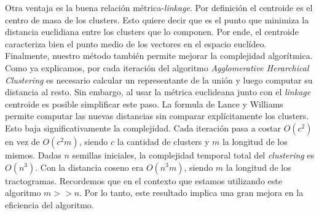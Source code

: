 Otra ventaja es la buena relaci\'on m\'etrica-\textit{linkage}. Por definici\'on
el centroide es el centro de masa de los clusters. Esto quiere decir que es el 
punto que minimiza la distancia euclidiana entre los clusters que lo componen. 
Por ende, el centroide caracteriza bien el punto medio de los vectores en el
espacio eucl\'ideo. \\

Finalmente, nuestro m\'etodo tambi\'en permite mejorar la complejidad algor\'itmica.
Como ya explicamos, por cada iteraci\'on del algoritmo 
\textit{Agglomerative Herarchical Clustering} es necesario calcular un representante
de la uni\'on y luego computar su distancia al resto. Sin embargo, al usar la
m\'etrica euclideana junto con el \textit{linkage} centroide es posible simplificar
este paso. La formula de Lance y Williams permite computar las nuevas distancias
sin comparar expl\'icitamente los clusters. Esto baja significativamente la
complejidad. Cada iteraci\'on pasa a costar $O(c^2)$ en vez de $O(c^2 m)$, siendo
$c$ la cantidad de clusters y $m$ la longitud de los mismos. Dadas $n$ semillas 
iniciales, la complejidad temporal total del \textit{clustering} es $O(n^3)$. 
Con la distancia coseno era $O(n^3 m)$, siendo $m$ la longitud de los tractogramas.
Recordemos que en el contexto que estamos utilizando este algoritmo $m>>n$. Por
lo tanto, este resultado implica una gran mejora en la eficiencia del algoritmo.  
